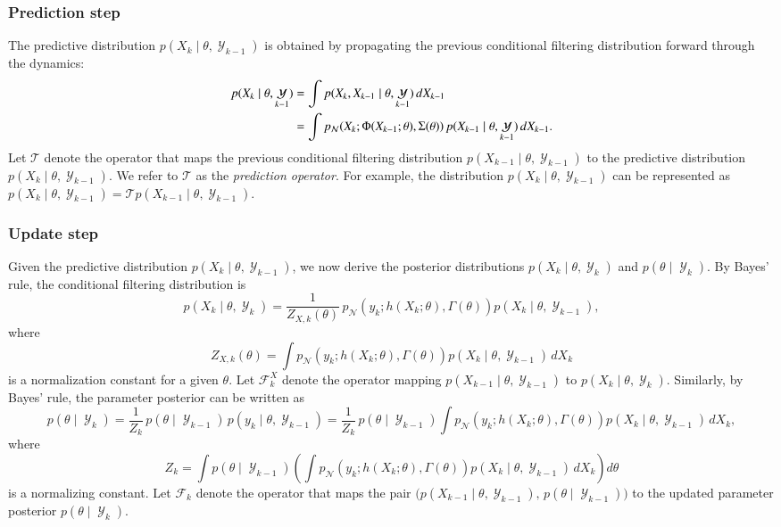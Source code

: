 \documentclass[preprint,3p,times]{elsarticle}
\DeclareMathOperator{\Y}{\mathcal{Y}}
\newcommand{\pdense}{p}
\begin{document}
\subsubsection{Prediction step}
\label{sec:pred_ana}
The predictive distribution $p(X_k \mid \theta, \Y_{k-1})$ is obtained by propagating the previous conditional filtering distribution forward through the dynamics:
\begin{align}
p(X_k \mid \theta, \Y_{k-1})
&= \int \pdense(X_k, X_{k-1} \mid \theta, \Y_{k-1})\,dX_{k-1} \notag\\
&= \int \pdense_{\mathcal{N}}\!\left(X_k; \Phi(X_{k-1};\theta), \Sigma(\theta)\right)\pdense(X_{k-1} \mid \theta, \Y_{k-1})\,dX_{k-1}.
\end{align}
Let $\mathcal{T}$ denote the operator that maps the previous conditional filtering distribution $\pdense(X_{k-1} \mid \theta, \Y_{k-1})$ to the predictive distribution $\pdense(X_k \mid \theta, \Y_{k-1})$. We refer to $\mathcal{T}$ as the \textit{prediction operator}. For example, the distribution $\pdense(X_k \mid \theta, \Y_{k-1})$ can be represented as $\pdense(X_k \mid \theta, \Y_{k-1}) = \mathcal{T}p(X_{k-1} \mid \theta, \Y_{k-1})$.


\subsubsection{Update step}
Given the predictive distribution $\pdense(X_k \mid \theta, \Y_{k-1})$, we now derive the posterior distributions $\pdense(X_k \mid \theta, \Y_k)$ and $\pdense(\theta \mid \Y_k)$.  By Bayes’ rule, the conditional filtering distribution is
\begin{equation}
\pdense(X_k \mid \theta, \Y_k)
= \frac{1}{Z_{X,k}(\theta)}\,\pdense_{\mathcal{N}}\!\left(y_k; h(X_k;\theta), \Gamma(\theta)\right)
\pdense(X_k \mid \theta, \Y_{k-1}),
\end{equation}
where
\[
Z_{X,k}(\theta)
= \int \pdense_{\mathcal{N}}\!\left(y_k; h(X_k;\theta), \Gamma(\theta)\right)
\pdense(X_k \mid \theta, \Y_{k-1})\,dX_k
\]
is a normalization constant for a given $\theta$.  
Let $\mathcal{F}_k^X$ denote the operator mapping $\pdense(X_{k-1} \mid \theta, \Y_{k-1})$ to $\pdense(X_k \mid \theta, \Y_k)$. Similarly, by Bayes’ rule, the parameter posterior can be written as
\begin{equation}
\pdense(\theta \mid \Y_k)
= \frac{1}{Z_k}\,\pdense(\theta \mid \Y_{k-1})\,p(y_k \mid \theta, \Y_{k-1})
= \frac{1}{Z_k}\,\pdense(\theta \mid \Y_{k-1})
\int \pdense_{\mathcal{N}}\!\left(y_k; h(X_k;\theta), \Gamma(\theta)\right)
\pdense(X_k \mid \theta, \Y_{k-1})\,dX_k,
\end{equation}
where
\[
Z_k
= \int \pdense(\theta \mid \Y_{k-1})
\left (\int \pdense_{\mathcal{N}}\!\left(y_k; h(X_k;\theta), \Gamma(\theta)\right)
\pdense(X_k \mid \theta, \Y_{k-1})\,dX_k\right )d\theta
\]
is a normalizing constant.  
Let $\mathcal{F}_k$ denote the operator that maps the pair $\big(\pdense(X_{k-1} \mid \theta, \Y_{k-1}),\, \pdense(\theta \mid \Y_{k-1})\big)$ to the updated parameter posterior $\pdense(\theta \mid \Y_k)$.
\end{document}
